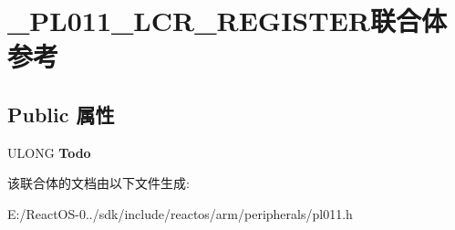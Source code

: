 \hypertarget{union___p_l011___l_c_r___r_e_g_i_s_t_e_r}{}\section{\+\_\+\+P\+L011\+\_\+\+L\+C\+R\+\_\+\+R\+E\+G\+I\+S\+T\+E\+R联合体 参考}
\label{union___p_l011___l_c_r___r_e_g_i_s_t_e_r}
\subsection*{Public 属性}
\begin{DoxyCompactItemize}
\item 
\mbox{\label{union___p_l011___l_c_r___r_e_g_i_s_t_e_r_a4517717b8b149819fc069af0974cf0cb}} 
U\+L\+O\+NG {\bfseries Todo}
\end{DoxyCompactItemize}


该联合体的文档由以下文件生成\+:\begin{DoxyCompactItemize}
\item 
E\+:/\+React\+O\+S-\/0../sdk/include/reactos/arm/peripherals/pl011.\+h\end{DoxyCompactItemize}
